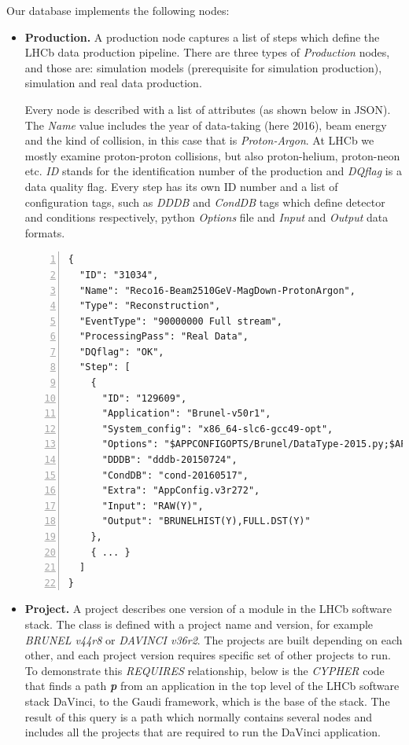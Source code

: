Our database implements the following nodes:
\begin{itemize}
    \item {\bf{Production.}}
    A production node captures a list of steps which define the LHCb data production pipeline. There are three types of \emph{Production} nodes, and those are: simulation models (prerequisite for simulation production), simulation and real data production. 
    
    Every node is described with a list of attributes (as shown below in JSON). The \emph{Name} value includes the year of data-taking (here 2016), beam energy and the kind of collision, in this case that is \emph{Proton-Argon}. At LHCb we mostly examine proton-proton collisions, but also proton-helium, proton-neon etc. {\it ID} stands for the identification number of the production and {\it DQflag} is a data quality flag. Every step has its own ID number and a list of configuration tags, such as {\it DDDB} and {\it CondDB} tags which define detector and conditions respectively, python \emph{Options} file and \emph{Input} and \emph{Output} data formats.
    
    \begin{Verbatim}[numbers=left,xleftmargin=5mm]
{
  "ID": "31034",
  "Name": "Reco16-Beam2510GeV-MagDown-ProtonArgon",
  "Type": "Reconstruction",
  "EventType": "90000000 Full stream",
  "ProcessingPass": "Real Data",
  "DQflag": "OK",
  "Step": [
    {
      "ID": "129609",
      "Application": "Brunel-v50r1",
      "System_config": "x86_64-slc6-gcc49-opt",
      "Options": "$APPCONFIGOPTS/Brunel/DataType-2015.py;$APPCONF...",
      "DDDB": "dddb-20150724",
      "CondDB": "cond-20160517",
      "Extra": "AppConfig.v3r272",
      "Input": "RAW(Y)",
      "Output": "BRUNELHIST(Y),FULL.DST(Y)"
    },
    { ... }
  ]
}
    \end{Verbatim}
    \item {\bf{Project.}}
    A project describes one version of a module in the LHCb software stack. The class is defined with a project name and version, for example \emph{BRUNEL v44r8} or \emph{DAVINCI v36r2}. The projects are built depending on each other, and each project version requires specific set of other projects to run. To demonstrate this {\it REQUIRES} relationship, below is the \emph{CYPHER} code that finds a path \textbf{\emph{p}} from an application in the top level of the LHCb software stack DaVinci, to the Gaudi framework, which is the base of the stack. The result of this query is a path which normally contains several nodes and includes all the projects that are required to run the DaVinci application.


\end{itemize}
